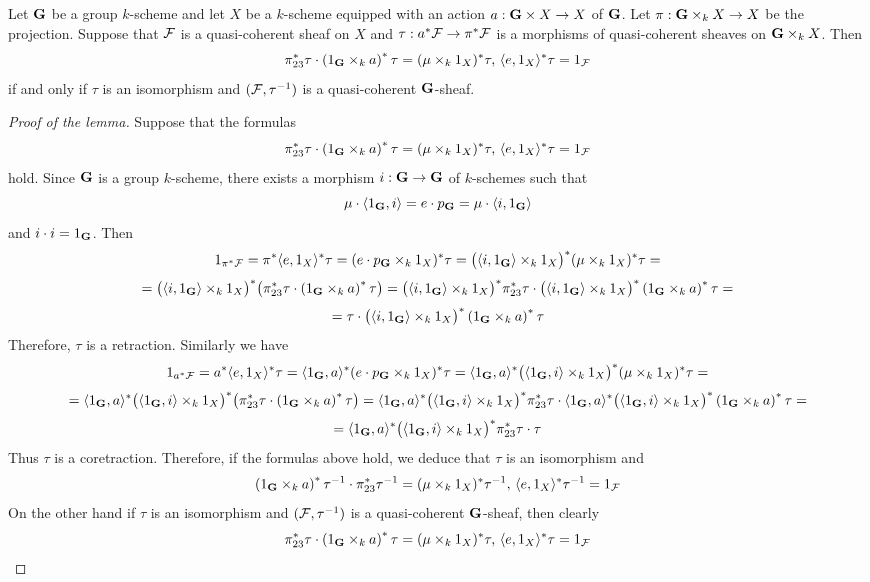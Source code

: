 \begin{lemma}\label{lemma:equivariant_formulas_for_group_imply_invertibility}
Let $\mathbf{G}$ be a group $k$-scheme and let $X$ be a $k$-scheme equipped with an action $a:\mathbf{G}\times X\rightarrow X$ of $\mathbf{G}$. Let $\pi:\mathbf{G}\times_kX\rightarrow X$ be the projection. Suppose that ${\mathcal F}$ is a quasi-coherent sheaf on $X$ and $\tau:a^*{\mathcal F}\rightarrow \pi^*{\mathcal F}$ is a morphisms of quasi-coherent sheaves on $\mathbf{G}\times_k X$. Then
$$\pi_{23}^*\tau\cdot \left(1_{\mathbf{G}}\times_k a\right)^*\tau= (\mu\times_k 1_X)^*\tau,\,\langle e,1_X \rangle^*\tau = 1_{{\mathcal F}}$$
if and only if $\tau$ is an isomorphism and $({\mathcal F},\tau^{-1})$ is a quasi-coherent $\mathbf{G}$-sheaf.
\end{lemma}
\begin{proof}[Proof of the lemma]
Suppose that the formulas
$$\pi_{23}^*\tau\cdot \left(1_{\mathbf{G}}\times_k a\right)^*\tau= (\mu\times_k 1_X)^*\tau,\,\langle e,1_X \rangle^*\tau = 1_{{\mathcal F}}$$
hold. Since $\mathbf{G}$ is a group $k$-scheme, there exists a morphism $i:\mathbf{G}\rightarrow \mathbf{G}$ of $k$-schemes such that
$$\mu\cdot \langle 1_{\mathbf{G}}, i \rangle = e\cdot p_{\mathbf{G}} = \mu\cdot \langle i, 1_{\mathbf{G}} \rangle$$
and $i\cdot i = 1_{\mathbf{G}}$. Then
$$ 1_{\pi^*{\mathcal F}}  = \pi^*\langle e,1_X \rangle^*\tau  = (e\cdot p_{\mathbf{G}}\times_k 1_X)^*\tau = \big(\langle i, 1_{\mathbf{G}} \rangle \times_k 1_X \big)^*(\mu\times_k 1_X)^*\tau =$$
$$=\big(\langle i, 1_{\mathbf{G}} \rangle \times_k 1_X \big)^*\big(\pi_{23}^*\tau\cdot \left(1_{\mathbf{G}}\times_k a\right)^*\tau\big) = \big(\langle i, 1_{\mathbf{G}} \rangle \times_k 1_X \big)^*\pi_{23}^*\tau \cdot \big(\langle i, 1_{\mathbf{G}} \rangle \times_k 1_X \big)^*\left(1_{\mathbf{G}}\times_k a\right)^*\tau = $$
$$= \tau \cdot  \big(\langle i, 1_{\mathbf{G}} \rangle \times_k 1_X \big)^*\left(1_{\mathbf{G}}\times_k a\right)^*\tau$$
Therefore, $\tau$ is a retraction. Similarly we have
$$1_{a^*{\mathcal F}} = a^*\langle e,1_X \rangle^*\tau  = \langle 1_{\mathbf{G}},a\rangle^*(e\cdot p_{\mathbf{G}}\times_k 1_X)^*\tau =\langle 1_{\mathbf{G}},a\rangle^*\big(\langle 1_{\mathbf{G}},i \rangle \times_k 1_X \big)^*(\mu\times_k 1_X)^*\tau  =$$
$$=\langle 1_{\mathbf{G}},a\rangle^*\big(\langle 1_{\mathbf{G}}, i \rangle \times_k 1_X \big)^*\big(\pi_{23}^*\tau\cdot \left(1_{\mathbf{G}}\times_k a\right)^*\tau\big) = \langle 1_{\mathbf{G}},a\rangle^*\big(\langle 1_{\mathbf{G}},i \rangle \times_k 1_X \big)^*\pi_{23}^*\tau \cdot \langle 1_{\mathbf{G}},a\rangle^*\big(\langle 1_{\mathbf{G}},i \rangle \times_k 1_X \big)^*\left(1_{\mathbf{G}}\times_k a\right)^*\tau =$$
$$=\langle 1_{\mathbf{G}},a\rangle^*\big(\langle 1_{\mathbf{G}},i \rangle \times_k 1_X \big)^*\pi_{23}^*\tau \cdot \tau$$
Thus $\tau$ is a coretraction. Therefore, if the formulas above hold, we deduce that $\tau$ is an isomorphism and
$$\left(1_{\mathbf{G}}\times_k a\right)^*\tau^{-1} \cdot \pi_{23}^*\tau^{-1} = (\mu\times_k 1_X)^*\tau^{-1},\,\langle e,1_X \rangle^*\tau^{-1} = 1_{{\mathcal F}}$$
On the other hand if $\tau$ is an isomorphism and $({\mathcal F},\tau^{-1})$ is a quasi-coherent $\mathbf{G}$-sheaf, then clearly
$$\pi_{23}^*\tau\cdot \left(1_{\mathbf{G}}\times_k a\right)^*\tau= (\mu\times_k 1_X)^*\tau,\,\langle e,1_X \rangle^*\tau = 1_{{\mathcal F}}$$
\end{proof}

